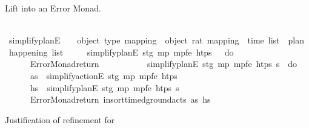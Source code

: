 \begin{isabellebody}
%
\endisadelimproof
%
\begin{isamarkuptext}%
Lift  into an Error Monad.%
\end{isamarkuptext}\isamarkuptrue%
\ \ \isamarkupfalse%
\ simplify{\isacharunderscore}{\kern0pt}planE\ {\isacharcolon}{\kern0pt}{\isacharcolon}{\kern0pt}\ {\isachardoublequoteopen}{\isacharunderscore}{\kern0pt}\ {\isasymRightarrow}\ {\isacharparenleft}{\kern0pt}object{\isacharcomma}{\kern0pt}\ type{\isacharparenright}{\kern0pt}\ mapping\ {\isasymRightarrow}\ {\isacharparenleft}{\kern0pt}object{\isacharcomma}{\kern0pt}\ rat{\isacharparenright}{\kern0pt}\ mapping\ {\isasymRightarrow}\ time\ list\ {\isasymRightarrow}\ plan\ {\isasymRightarrow}\ {\isacharunderscore}{\kern0pt}{\isacharplus}{\kern0pt}happening\ list{\isachardoublequoteclose}\ \isanewline
\ \ \ \ {\isachardoublequoteopen}simplify{\isacharunderscore}{\kern0pt}planE\ stg\ mp\ mp{\isacharunderscore}{\kern0pt}fe\ htps\ {\isacharbrackleft}{\kern0pt}{\isacharbrackright}{\kern0pt}\ {\isacharequal}{\kern0pt}\ do\ {\isacharbraceleft}{\kern0pt}\ \isanewline
\ \ \ \ \ \ Error{\isacharunderscore}{\kern0pt}Monad{\isachardot}{\kern0pt}return\ {\isacharbrackleft}{\kern0pt}{\isacharbrackright}{\kern0pt}\ \isanewline
\ \ \ \ {\isacharbraceright}{\kern0pt}{\isachardoublequoteclose}\ \isanewline
\ \ {\isacharbar}{\kern0pt}\ {\isachardoublequoteopen}simplify{\isacharunderscore}{\kern0pt}planE\ stg\ mp\ mp{\isacharunderscore}{\kern0pt}fe\ htps\ {\isacharparenleft}{\kern0pt}{\isasympi}{\isacharhash}{\kern0pt}{\isasympi}s{\isacharparenright}{\kern0pt}\ {\isacharequal}{\kern0pt}\ do\ {\isacharbraceleft}{\kern0pt}\isanewline
\ \ \ \ \ \ as\ {\isasymleftarrow}\ simplify{\isacharunderscore}{\kern0pt}actionE\ stg\ mp\ mp{\isacharunderscore}{\kern0pt}fe\ htps\ {\isasympi}{\isacharsemicolon}{\kern0pt}\isanewline
\ \ \ \ \ \ hs\ {\isasymleftarrow}\ simplify{\isacharunderscore}{\kern0pt}planE\ stg\ mp\ mp{\isacharunderscore}{\kern0pt}fe\ htps\ {\isasympi}s{\isacharsemicolon}{\kern0pt}\isanewline
\ \ \ \ \ \ Error{\isacharunderscore}{\kern0pt}Monad{\isachardot}{\kern0pt}return\ {\isacharparenleft}{\kern0pt}insort{\isacharunderscore}{\kern0pt}timed{\isacharunderscore}{\kern0pt}ground{\isacharunderscore}{\kern0pt}acts\ as\ hs{\isacharparenright}{\kern0pt}\isanewline
\ \ \ \ {\isacharbraceright}{\kern0pt}{\isachardoublequoteclose}%
\begin{isamarkuptext}%
Justification of refinement for %

\end{isamarkuptext}
\end{isabellebody}

